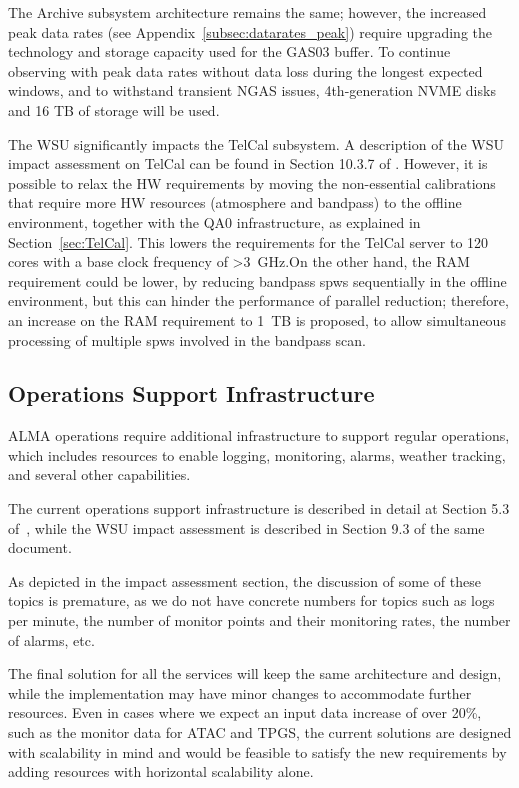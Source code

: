 The Archive subsystem architecture remains the same; however, the increased peak data rates (see Appendix~\ref{subsec:datarates_peak}) require upgrading the technology and storage capacity used for the GAS03 buffer. To continue observing with peak data rates without data loss during the longest expected windows, and to withstand transient \ac{NGAS} issues, 4th-generation \ac{NVME} disks and 16 TB of storage will be used.

The WSU significantly impacts the TelCal subsystem. A description of the WSU impact assessment on TelCal can be found in Section 10.3.7 of \cite{CSA-IA}. However, it is possible to relax the HW requirements by moving the non-essential calibrations that require more HW resources (atmosphere and bandpass) to the offline environment, together with the QA0 infrastructure, as explained in Section~\ref{sec:TelCal}. This lowers the requirements for the TelCal server to 120 cores with a base clock frequency of >3~GHz.On the other hand, the RAM requirement could be lower, by reducing bandpass \acp{spw} sequentially in the offline environment, but this can hinder the performance of parallel reduction; therefore, an increase on the RAM requirement to 1~TB is proposed, to allow simultaneous processing of multiple \acp{spw} involved in the bandpass scan.




\subsection{Operations Support Infrastructure}
\label{sec:opsInfrastructure}
ALMA operations require additional infrastructure to support regular operations, which includes resources to enable logging, monitoring, alarms, weather tracking, and several other capabilities.

The current operations support infrastructure is described in detail at Section 5.3 of~\cite{CSA-IA}, while the WSU impact assessment is described in Section 9.3 of the same document.

As depicted in the impact assessment section, the discussion of some of these topics is premature, as we do not have concrete numbers for topics such as logs per minute, the number of monitor points and their monitoring rates, the number of alarms, etc.

The final solution for all the services will keep the same architecture and design, while the implementation may have minor changes to accommodate further resources. Even in cases where we expect an input data increase of over 20\%, such as the monitor data for ATAC and TPGS, the current solutions are designed with scalability in mind and would be feasible to satisfy the new requirements by adding resources with horizontal scalability alone.


